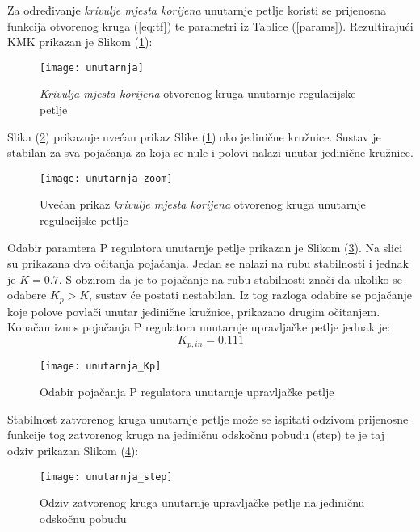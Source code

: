 \documentclass[11pt,a4paper]{article}
\begin{document}
\medskip

Za određivanje \textit{krivulje mjesta korijena} unutarnje petlje koristi se prijenosna funkcija otvorenog kruga (\ref{eq:tf}) te parametri iz Tablice (\ref{params}). Rezultirajući KMK prikazan je Slikom (\ref{fig:KMK_in}):

\begin{figure}[H]
	\centering
	\texttt{[image: unutarnja]}
	\caption{\textit{Krivulja mjesta korijena} otvorenog kruga unutarnje regulacijske petlje}
	\label{fig:KMK_in}
\end{figure}

\newpage
Slika (\ref{fig:KMK_in_zoom}) prikazuje uvećan prikaz Slike (\ref{fig:KMK_in}) oko jedinične kružnice. Sustav je stabilan za sva pojačanja za koja se nule i polovi nalazi unutar jedinične kružnice.

\begin{figure}[H]
	\centering
	\texttt{[image: unutarnja\_zoom]}
	\caption{Uvećan prikaz \textit{krivulje mjesta korijena} otvorenog kruga unutarnje regulacijske petlje}
	\label{fig:KMK_in_zoom}
\end{figure}


 Odabir paramtera P regulatora unutarnje petlje prikazan je Slikom (\ref{fig:unutarnja_Kp}). Na slici su prikazana dva očitanja pojačanja. Jedan se nalazi na rubu stabilnosti i jednak je $K= 0.7$. S obzirom da je to pojačanje na rubu stabilnosti znači da ukoliko se odabere $K_{p} > K$, sustav će postati nestabilan. Iz tog razloga odabire se pojačanje koje polove povlači unutar jedinične kružnice, prikazano drugim očitanjem. Konačan iznos pojačanja P regulatora unutarnje upravljačke petlje jednak je:
 \begin{equation}
 \boxed{
 K_{p,in} = 0.111
 }
 \label{eq:Kp_in}
 \end{equation}


\begin{figure}[H]
	\centering
	\texttt{[image: unutarnja\_Kp]}
	\caption{Odabir pojačanja P regulatora unutarnje upravljačke petlje}
	\label{fig:unutarnja_Kp}
\end{figure}

Stabilnost zatvorenog kruga unutarnje petlje može se ispitati odzivom prijenosne funkcije tog zatvorenog kruga na jediničnu odskočnu pobudu (step) te je taj odziv prikazan Slikom (\ref{fig:step1}):

\begin{figure}[H]
	\centering
	\texttt{[image: unutarnja\_step]}
	\caption{Odziv zatvorenog kruga unutarnje upravljačke petlje na jediničnu odskočnu pobudu}
	\label{fig:step1}
\end{figure}
\end{document}
